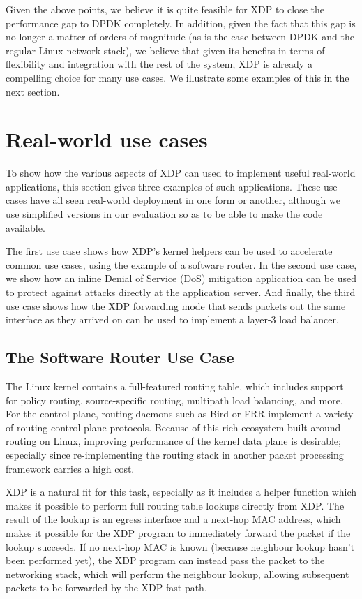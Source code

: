 \documentclass[10pt,sigconf]{acmart}
\begin{document}
Given the above points, we believe it is quite feasible for XDP to close the
performance gap to DPDK completely. In addition, given the fact that this gap is
no longer a matter of orders of magnitude (as is the case between DPDK and the
regular Linux network stack), we believe that given its benefits in terms of
flexibility and integration with the rest of the system, XDP is already a
compelling choice for many use cases. We illustrate some examples of this in the
next section.

\section{Real-world use cases}
\label{sec:usecases}
To show how the various aspects of XDP can used to implement useful real-world
applications, this section gives three examples of such applications. These use
cases have all seen real-world deployment in one form or another, although we
use simplified versions in our evaluation so as to be able to make the code
available.

The first use case shows how XDP's kernel helpers can be used to accelerate
common use cases, using the example of a software router. In the second use
case, we show how an inline Denial of Service (DoS) mitigation application can
be used to protect against attacks directly at the application server. And
finally, the third use case shows how the XDP forwarding mode that sends packets
out the same interface as they arrived on can be used to implement a layer-3
load balancer.

\subsection{The Software Router Use Case}
\label{sec:fwd-usecase}
The Linux kernel contains a full-featured routing table, which includes support
for policy routing, source-specific routing, multipath load balancing, and more.
For the control plane, routing daemons such as Bird or FRR implement a variety
of routing control plane protocols. Because of this rich ecosystem built around
routing on Linux, improving performance of the kernel data plane is desirable;
especially since re-implementing the routing stack in another packet processing
framework carries a high cost.

XDP is a natural fit for this task, especially as it includes a helper function
which makes it possible to perform full routing table lookups directly from XDP.
The result of the lookup is an egress interface and a next-hop MAC address,
which makes it possible for the XDP program to immediately forward the packet if
the lookup succeeds. If no next-hop MAC is known (because neighbour lookup
hasn't been performed yet), the XDP program can instead pass the packet to the
networking stack, which will perform the neighbour lookup, allowing subsequent
packets to be forwarded by the XDP fast path.
\end{document}
